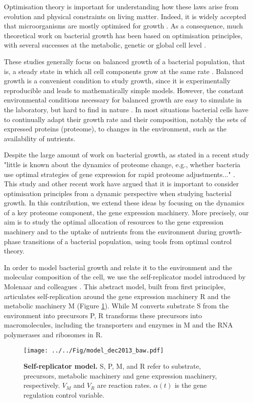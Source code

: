 \documentclass[a4paper, 10pt, conference]{ieeeconf}      %
\begin{document}
Optimisation theory is important for understanding how these laws arise from evolution and physical constraints on living matter.
Indeed, it is widely accepted that microorganisms are mostly optimised for growth \cite{dekel_optimality_2005}.
As a consequence, much theoretical work on bacterial growth has been based on optimisation principles, with several successes at the metabolic, genetic or global cell level \cite{edwards_escherichia_2000, molenaar_shifts_2009}.

These studies generally focus on balanced growth of a bacterial population, that is, a steady state in which all cell components grow at the same rate \cite{neidhardt_physiology_1990}.
Balanced growth is a convenient condition to study growth, since it is experimentally reproducible and leads to mathematically simple models.
However, the constant environmental conditions necessary for balanced growth are easy to simulate in the laboratory, but hard to find in nature \cite{neidhardt_physiology_1990}.
In most situations bacterial cells have to continually adapt their growth rate and their composition, notably the sets of expressed proteins (proteome), to changes in the environment, such as the availability of nutrients. 

Despite the large amount of work on bacterial growth, as stated in a recent study "little is known about the dynamics of proteome change, e.g., whether bacteria use optimal strategies of gene expression for rapid proteome adjustments..." \cite{pavlov_optimal_2013}.
This study and other recent work \cite{ehrenberg_medium-dependent_2013} have argued that it is important to consider optimisation principles from a dynamic perspective when studying bacterial growth.
In this contribution, we extend these ideas by focusing on the dynamics of a key proteome component, the gene expression machinery.
More precisely, our aim is to study the optimal allocation of resources to the gene expression machinery and to the uptake of nutrients from the environment during growth-phase transitions of a bacterial population, using tools from optimal control theory.

In order to model bacterial growth and relate it to the environment and the molecular composition of the cell, we use the self-replicator model introduced by Molenaar and colleagues \cite{molenaar_shifts_2009}.
This abstract model, built from first principles, articulates self-replication around the gene expression machinery R and the metabolic machinery M (Figure \ref{fig::selfrep}). While M converts substrate S from the environment into precursors P, R transforms these precursors into macromolecules, including the transporters and enzymes in M and the RNA polymerases and ribosomes in R.
\begin{figure}[h]
\centering
\texttt{[image: ../../Fig/model\_dec2013\_baw.pdf]}
\caption{\textbf{Self-replicator model.} S, P, M, and R refer to substrate, precursors, metabolic machinery and gene expression machinery, respectively.
$V_M$ and $V_R$ are reaction rates.
$\alpha(t)$ is the gene regulation control variable.}
\label{fig::selfrep}
\end{figure}
\end{document}
